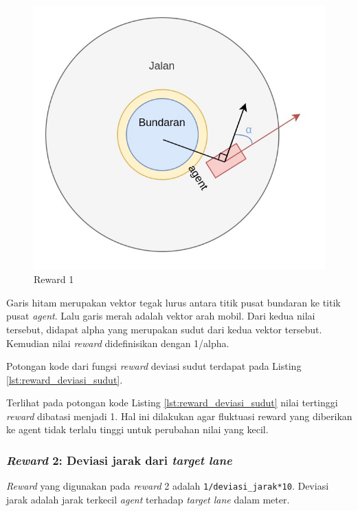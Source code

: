 \begin{figure}[H] 
	\centering
	\includegraphics[width=1\linewidth]{images/reward_anglediff_sketch}
	\caption{Reward 1}
	\label{fig:reward_anglediff_sketch}
\end{figure}

Garis hitam merupakan vektor tegak lurus antara titik pusat bundaran ke titik pusat \textit{agent}. Lalu garis merah adalah vektor arah mobil. Dari kedua nilai tersebut, didapat alpha yang merupakan sudut dari kedua vektor tersebut. Kemudian nilai \textit{reward }didefinisikan dengan 1/alpha.

Potongan kode dari fungsi \textit{reward} deviasi sudut terdapat pada Listing \ref{lst:reward_deviasi_sudut}.



Terlihat pada potongan kode Listing \ref{lst:reward_deviasi_sudut} nilai tertinggi \textit{reward} dibatasi menjadi 1. Hal ini dilakukan agar fluktuasi reward yang diberikan ke agent tidak terlalu tinggi untuk perubahan nilai yang kecil.


\subsubsection{\textit{Reward} 2: Deviasi jarak dari \textit{target lane}}
\textit{Reward} yang digunakan pada \textit{reward} 2 adalah \verb=1/deviasi_jarak*10=. Deviasi jarak adalah jarak terkecil \textit{agent} terhadap \textit{target lane} dalam meter.


